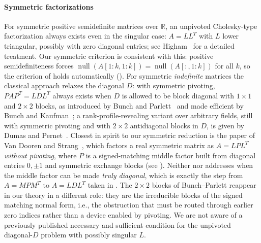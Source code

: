\documentclass[preprint,12pt]{elsarticle}
\theoremstyle{plain}
\theoremstyle{nonumberplain}
\numberwithin{equation}{section}
\DeclareMathOperator{\nl}{null}
\newcommand{\by}{\times}
\numberwithin{theorem}{section}
\begin{document}
\paragraph{Symmetric factorizations}
For symmetric positive semidefinite matrices over $\mathbb{R}$, an unpivoted Cholesky-type factorization always exists even in the singular case: $A = LL^T$ with $L$ lower triangular, possibly with zero diagonal entries; see Higham~\cite{higham_cholesky_1990} for a detailed treatment.  Our symmetric criterion is consistent with this: positive semidefiniteness forces $\nl(A[1:k,1:k]) = \nl(A[:,1:k])$ for all $k$, so the criterion of  holds automatically ().  For symmetric \emph{indefinite} matrices the classical approach relaxes the diagonal $D$: with symmetric pivoting, $PAP^T = LDL^T$ always exists when $D$ is allowed to be block diagonal with $1 \by 1$ and $2 \by 2$ blocks, as introduced by Bunch and Parlett~\cite{bunch_parlett_1971} and made efficient by Bunch and Kaufman~\cite{bunch_kaufman_1977}; a rank-profile-revealing variant over arbitrary fields, still with symmetric pivoting and with $2 \by 2$ antidiagonal blocks in $D$, is given by Dumas and Pernet~\cite{dumas_pernet_2018}.  Closest in spirit to our symmetric reduction is the paper of Van Dooren and Strang~\cite{vandooren_strang_2014}, which factors a real symmetric matrix as $A = L P L^T$ \emph{without pivoting}, where $P$ is a signed-matching middle factor built from diagonal entries $0, \pm 1$ and symmetric exchange blocks (see ).  Neither \cite{vandooren_strang_2014} nor \cite{dumas_pernet_2018} addresses when the middle factor can be made \emph{truly diagonal}, which is exactly the step from $A = MPM^T$ to $A = LDL^T$ taken in .  The $2 \by 2$ blocks of Bunch--Parlett reappear in our theory in a different role: they are the irreducible blocks of the signed matching normal form, i.e., the obstruction that must be routed through earlier zero indices rather than a device enabled by pivoting.  We are not aware of a previously published necessary and sufficient condition for the unpivoted diagonal-$D$ problem with possibly singular $L$.
\end{document}
